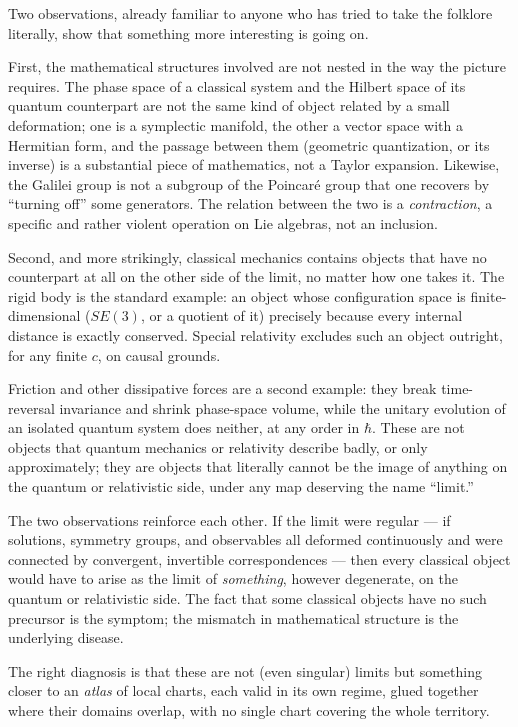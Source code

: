  Two observations, already familiar to anyone who has tried to take the
folklore literally, show that something more interesting is going on.

First, the mathematical structures involved are not nested in the way the
picture requires. The phase space of a classical system and the Hilbert space
of its quantum counterpart are not the same kind of object related by a small
deformation; one is a symplectic manifold, the other a vector space with a
Hermitian form, and the passage between them (geometric quantization, or its
inverse) is a substantial piece of mathematics, not a Taylor expansion.
Likewise, the Galilei group is not a subgroup of the Poincar\'e group that one
recovers by ``turning off'' some generators. The relation between the
two is a \emph{contraction}, a specific and rather violent operation on Lie
algebras, not an inclusion.

Second, and more strikingly, classical mechanics contains objects that have no
counterpart at all on the other side of the limit, no matter how one takes it.
The rigid body is the standard example: an object whose configuration space is
finite-dimensional ($SE(3)$, or a quotient of it) precisely because every
internal distance is exactly conserved. Special relativity excludes such an
object outright, for any finite $c$, on causal grounds.

Friction and other dissipative forces are a second example: they break
time-reversal invariance and shrink phase-space volume, while the unitary
evolution of an isolated quantum system does neither, at any order in $\hbar$.
 These are not objects that quantum mechanics or
relativity describe badly, or only approximately; they are objects that
literally cannot be the image of anything on the quantum or relativistic side,
under any map deserving the name ``limit.''

The two observations reinforce each other. If the limit were regular --- if
solutions, symmetry groups, and observables all deformed continuously and were
connected by convergent, invertible correspondences --- then every classical
object would have to arise as the limit of \emph{something}, however
degenerate, on the quantum or relativistic side. The fact that some classical
objects have no such precursor is the symptom; the mismatch in mathematical
structure is the underlying disease. 

The right diagnosis is
that these are not (even singular) limits 
but something closer to an \emph{atlas} of local charts, each
valid in its own regime, glued together where their domains overlap, with no
single chart covering the whole territory.

